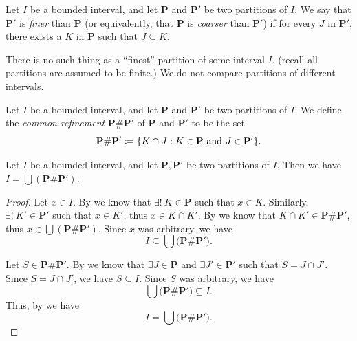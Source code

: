 \begin{defn}\label{i:11.1.14}
  Let \(I\) be a bounded interval, and let \(\mathbf{P}\) and \(\mathbf{P}'\) be two partitions of \(I\).
  We say that \(\mathbf{P}'\) is \emph{finer} than \(\mathbf{P}\) (or equivalently, that \(\mathbf{P}\) is \emph{coarser} than \(\mathbf{P}'\)) if for every \(J\) in \(\mathbf{P}'\), there exists a \(K\) in \(\mathbf{P}\) such that \(J \subseteq K\).
\end{defn}

\begin{note}
  There is no such thing as a ``finest'' partition of some interval \(I\).
  (recall all partitions are assumed to be finite.)
  We do not compare partitions of different intervals.
\end{note}

\setcounter{thm}{15}
\begin{defn}\label{i:11.1.16}
  Let \(I\) be a bounded interval, and let \(\mathbf{P}\) and \(\mathbf{P}'\) be two partitions of \(I\).
  We define the \emph{common refinement} \(\mathbf{P} \# \mathbf{P}'\) of \(\mathbf{P}\) and \(\mathbf{P}'\) to be the set
  \[
    \mathbf{P} \# \mathbf{P}' \coloneqq \set{K \cap J : K \in \mathbf{P} \text{ and } J \in \mathbf{P}'}.
  \]
\end{defn}

\begin{ac}\label{i:ac:11.1.1}
  Let \(I\) be a bounded interval, and let \(\mathbf{P}, \mathbf{P}'\) be two partitions of \(I\).
  Then we have \(I = \bigcup (\mathbf{P} \# \mathbf{P}')\).
\end{ac}

\begin{proof}
  Let \(x \in I\).
  By  we know that \(\exists!\ K \in \mathbf{P}\) such that \(x \in K\).
  Similarly, \(\exists!\ K' \in \mathbf{P}'\) such that \(x \in K'\), thus \(x \in K \cap K'\).
  By  we know that \(K \cap K' \in \mathbf{P} \# \mathbf{P}'\), thus \(x \in \bigcup (\mathbf{P} \# \mathbf{P}')\).
  Since \(x\) was arbitrary, we have
  \[
    I \subseteq \bigcup \big(\mathbf{P} \# \mathbf{P}'\big).
  \]

  Let \(S \in \mathbf{P} \# \mathbf{P}'\).
  By  we know that \(\exists J \in \mathbf{P}\) and \(\exists J' \in \mathbf{P}'\) such that \(S = J \cap J'\).
  Since \(S = J \cap J'\), we have \(S \subseteq I\).
  Since \(S\) was arbitrary, we have
  \[
    \bigcup \big(\mathbf{P} \# \mathbf{P}'\big) \subseteq I.
  \]
  Thus, by  we have
  \[
    I = \bigcup \big(\mathbf{P} \# \mathbf{P}'\big).
  \]
\end{proof}

